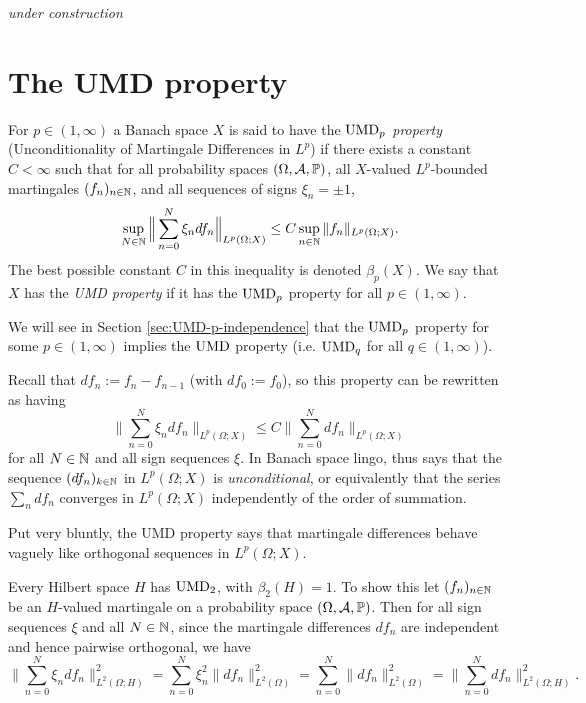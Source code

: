 \emph{under construction}


\section{The UMD property}

\begin{defn}
  For $p \in (1,\infty)$ a Banach space $X$ is said to have the \emph{$\mathrm{UMD}_{p}$ property} (Unconditionality of Martingale Differences in $L^p$) if there exists a constant $C < \infty$ such that for all probability spaces $(\Omega,\mathcal{A},\mathbb{P})$, all $X$-valued $L^p$-bounded martingales $(f_n)_{n \in \mathbb{N}}$, and all sequences of signs $\xi_n = \pm 1$,
  \begin{equation*}
    \sup_{N \in \mathbb{N}} \Big\| \sum_{n=0}^{N} \xi_{n} df_{n} \Big\|_{L^p(\Omega;X)} \leq C \sup_{n \in \mathbb{N}} \|f_n\|_{L^p(\Omega;X)}.
  \end{equation*}
  The best possible constant $C$ in this inequality is denoted $\beta_{p}(X)$.
  We say that $X$ has the \emph{UMD property} if it has the $\mathrm{UMD}_{p}$ property for all $p \in (1,\infty)$.
\end{defn}

\begin{rmk}
  We will see in Section \ref{sec:UMD-p-independence} that the $\mathrm{UMD}_{p}$ property for some $p \in (1,\infty)$ implies the $\mathrm{UMD}$ property (i.e. $\mathrm{UMD}_{q}$ for all $q \in (1,\infty)$).
\end{rmk}

Recall that $df_{n} := f_n - f_{n-1}$ (with $df_0 := f_0$), so this property can be rewritten as having
\begin{equation*}
  \Big\| \sum_{n=0}^{N} \xi_{n} df_{n} \Big\|_{L^p(\Omega;X)} \leq C \Big\| \sum_{n=0}^{N} df_{n}\Big\|_{L^p(\Omega;X)}
\end{equation*}
for all $N \in \mathbb{N}$ and all sign sequences $\xi$.
In Banach space lingo, thus says that the sequence $(df_n)_{k \in \mathbb{N}}$ in $L^p(\Omega;X)$ is \emph{unconditional}, or equivalently that the series $\sum_{n} df_n$ converges in $L^p(\Omega;X)$ independently of the order of summation.

Put very bluntly, the UMD property says that martingale differences behave vaguely like orthogonal sequences in $L^p(\Omega;X)$.

\begin{example}
  Every Hilbert space $H$ has $\mathrm{UMD}_{2}$, with $\beta_{2}(H) = 1$.
  To show this let $(f_n)_{n \in \mathbb{N}}$ be an $H$-valued martingale on a probability space $(\Omega,\mathcal{A},\mathbb{P})$.
  Then for all sign sequences $\xi$ and all $N \in \mathbb{N}$, since the martingale differences $df_{n}$ are independent and hence pairwise orthogonal, we have
  \begin{equation*}
      \Big\| \sum_{n=0}^N \xi_{n} df_{n} \Big\|_{L^2(\Omega;H)}^{2}
      = \sum_{n = 0}^{N} \xi_{n}^{2} \|df_{n}\|_{L^2(\Omega)}^{2}
      = \sum_{n = 0}^{N} \|df_{n}\|_{L^2(\Omega)}^{2}
      = \Big\| \sum_{n=0}^N df_{n} \Big\|_{L^2(\Omega;H)}^{2}.
  \end{equation*}
\end{example}

